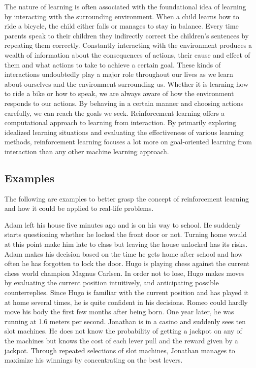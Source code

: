 \documentclass[titlepage]{article}
\begin{document}
\vskip 0.3cm

The nature of learning is often associated with the foundational idea of learning by interacting with the surrounding environment. When a child learns how to ride a bicycle, the child either falls or manages to stay in balance. Every time parents speak to their children they indirectly correct the children's sentences by repeating them correctly. Constantly interacting with the environment produces a wealth of information about the consequences of actions, their cause and effect of them and what actions to take to achieve a certain goal. These kinds of interactions undoubtedly play a major role throughout our lives as we learn about ourselves and the environment surrounding us. Whether it is learning how to ride a bike or how to speak, we are always aware of how the environment responds to our actions. By behaving in a certain manner and choosing actions carefully, we can reach the goals we seek. Reinforcement learning \cite{sutton} offers a computational approach to learning from interaction. By primarily exploring idealized learning situations and evaluating the effectiveness of various learning methods, reinforcement learning focuses a lot more on goal-oriented learning from interaction than any other machine learning approach. 

\subsection{Examples}

\vskip 0.3cm

The following are examples to better grasp the concept of reinforcement learning and how it could be applied to real-life problems.

\vskip 0.3cm

\begin{outline}
    \1 Adam left his house five minutes ago and is on his way to school. He suddenly starts questioning whether he locked the front door or not. Turning home would at this point make him late to class but leaving the house unlocked has its risks. Adam makes his decision based on the time he gets home after school and how often he has forgotten to lock the door. 
    \1 Hugo is playing chess against the current chess world champion Magnus Carlsen. In order not to lose, Hugo makes moves by evaluating the current position intuitively, and anticipating possible counterreplies. Since Hugo is familiar with the current position and has played it at home several times, he is quite confident in his decisions. 
    \1 Romeo could hardly move his body the first few months after being born. One year later, he was running at 1.6 meters per second.
    \1 Jonathan is in a casino and suddenly sees ten slot machines. He does not know the probability of getting a jackpot on any of the machines but knows the cost of each lever pull and the reward given by a jackpot. Through repeated selections of slot machines, Jonathan manages to maximize his winnings by concentrating on the best levers. \end{outline}
\end{document}

